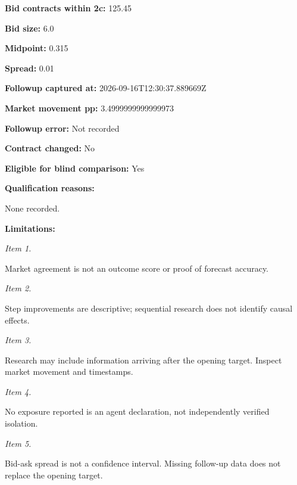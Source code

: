 \documentclass[11pt]{article}
\begin{document}
\par\noindent\textbf{Bid contracts within 2c:} 125.45

\par\noindent\textbf{Bid size:} 6.0

\par\noindent\textbf{Midpoint:} 0.315

\par\noindent\textbf{Spread:} 0.01

\par\noindent\textbf{Followup captured at:} 2026-09-16T12:30:37.889669Z

\par\noindent\textbf{Market movement pp:} 3.4999999999999973

\par\noindent\textbf{Followup error:} Not recorded

\par\noindent\textbf{Contract changed:} No

\par\noindent\textbf{Eligible for blind comparison:} Yes

\par\noindent\textbf{Qualification reasons:} \par None recorded.

\par\noindent\textbf{Limitations:} \par \par\noindent\textit{Item 1.}\par Market agreement is not an outcome score or proof of forecast accuracy.

\par\noindent\textit{Item 2.}\par Step improvements are descriptive; sequential research does not identify causal effects.

\par\noindent\textit{Item 3.}\par Research may include information arriving after the opening target. Inspect market movement and timestamps.

\par\noindent\textit{Item 4.}\par No exposure reported is an agent declaration, not independently verified isolation.

\par\noindent\textit{Item 5.}\par Bid-ask spread is not a confidence interval. Missing follow-up data does not replace the opening target.
\end{document}
